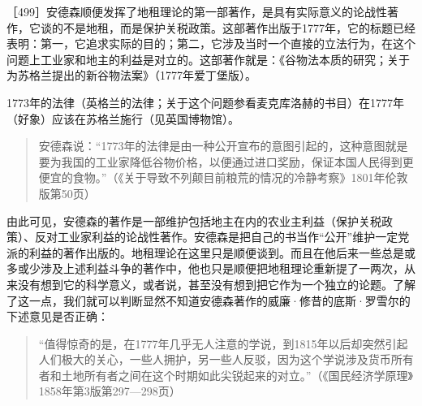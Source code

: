［499］安德森顺便发挥了地租理论的第一部著作，是具有实际意义的论战性著作，它谈的不是地租，而是保护关税政策。这部著作出版于1777年，它的标题已经表明：第一，它追求实际的目的；第二，它涉及当时一个直接的立法行为，在这个问题上工业家和地主的利益是对立的。这部著作就是：《谷物法本质的研究；关于为苏格兰提出的新谷物法案》（1777年爱丁堡版）。

1773年的法律（英格兰的法律；关于这个问题参看麦克库洛赫的书目）在1777年（好象）应该在苏格兰施行（见英国博物馆）。

\begin{quote}{安德森说：“1773年的法律是由一种公开宣布的意图引起的，这种意图就是要为我国的工业家降低谷物价格，以便通过进口奖励，保证本国人民得到更便宜的食物。”（《关于导致不列颠目前粮荒的情况的冷静考察》1801年伦敦版第50页）}\end{quote}

由此可见，安德森的著作是一部维护包括地主在内的农业主利益（保护关税政策）、反对工业家利益的论战性著作。安德森是把自己的书当作“公开”维护一定党派的利益的著作出版的。地租理论在这里只是顺便谈到。而且在他后来一些总是或多或少涉及上述利益斗争的著作中，他也只是顺便把地租理论重新提了一两次，从来没有想到它的科学意义，或者说，甚至没有想到把它作为一个独立的论题。了解了这一点，我们就可以判断显然不知道安德森著作的威廉·修昔的底斯·罗雪尔的下述意见是否正确：

\begin{quote}{“值得惊奇的是，在1777年几乎无人注意的学说，到1815年以后却突然引起人们极大的关心，一些人拥护，另一些人反驳，因为这个学说涉及货币所有者和土地所有者之间在这个时期如此尖锐起来的对立。”（《国民经济学原理》1858年第3版第297—298页）}\end{quote}

